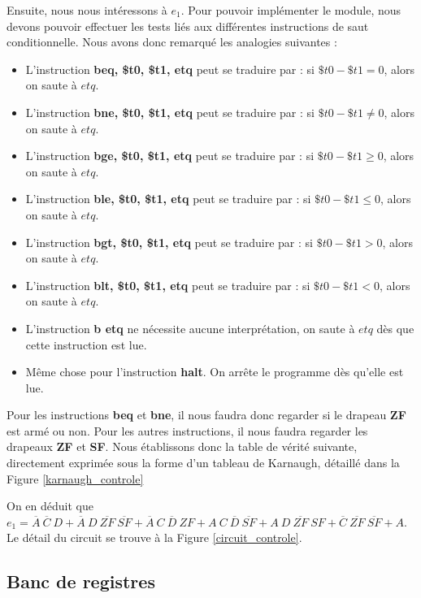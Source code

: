 \documentclass[10pt,a4paper]{article}
\begin{document}
Ensuite, nous nous intéressons à $e_1$. Pour pouvoir implémenter le module, nous devons pouvoir effectuer les tests liés aux différentes instructions de saut conditionnelle. Nous avons donc remarqué les analogies suivantes :
\begin{itemize}
\item L'instruction \textbf{beq, \$t0, \$t1, etq} peut se traduire par : si $\$t0 - \$t1 = 0$, alors on saute à $etq$.
\item L'instruction \textbf{bne, \$t0, \$t1, etq} peut se traduire par : si $\$t0 - \$t1\neq0$, alors on saute à $etq$.
\item L'instruction \textbf{bge, \$t0, \$t1, etq} peut se traduire par : si $\$t0 - \$t1 \geq0$, alors on saute à $etq$.
\item L'instruction \textbf{ble, \$t0, \$t1, etq} peut se traduire par : si $\$t0 - \$t1 \leq0$, alors on saute à $etq$.
\item L'instruction \textbf{bgt, \$t0, \$t1, etq} peut se traduire par : si $\$t0 - \$t1 > 0$, alors on saute à $etq$.
\item L'instruction \textbf{blt, \$t0, \$t1, etq} peut se traduire par : si $\$t0 - \$t1 < 0$, alors on saute à $etq$.
\item L'instruction \textbf{b etq} ne nécessite aucune interprétation, on saute à $etq$ dès que cette instruction est lue.
\item Même chose pour l'instruction \textbf{halt}. On arrête le programme dès qu'elle est lue.
\end{itemize}
\vspace{0.2cm}
Pour les instructions \textbf{beq} et \textbf{bne}, il nous faudra donc regarder si le drapeau \textbf{ZF} est armé ou non. Pour les autres instructions, il nous faudra regarder les drapeaux \textbf{ZF} et \textbf{SF}. Nous établissons donc la table de vérité suivante, directement exprimée sous la forme d'un tableau de Karnaugh, détaillé dans la Figure \ref{karnaugh_controle}

On en déduit que $e_1 = \overline{A}~\overline{C}~D + \overline{A}~D~\overline{ZF}~\overline{SF} + \overline{A}~C~\overline{D}~ZF + A~C~\overline{D}~\overline{SF} + A~D~\overline{ZF}~SF + \overline{C}~\overline{ZF}~\overline{SF} + A$. Le détail du circuit se trouve à la Figure \ref{circuit_controle}.

\subsection{Banc de registres}
\end{document}
